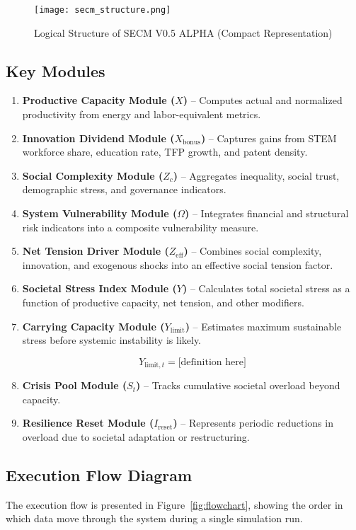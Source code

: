 \documentclass[12pt,a4paper]{article}
\begin{document}
\begin{figure}[H]
    \centering
    \texttt{[image: secm\_structure.png]}
    \caption{Logical Structure of SECM V0.5 ALPHA (Compact Representation)}
    \label{fig:structure}
\end{figure}

\subsection{Key Modules}
\begin{enumerate}
    \item \textbf{Productive Capacity Module (\(X\))} – Computes actual and normalized productivity from energy and labor-equivalent metrics.
    \item \textbf{Innovation Dividend Module (\(X_{\text{bonus}}\))} – Captures gains from STEM workforce share, education rate, TFP growth, and patent density.
    \item \textbf{Social Complexity Module (\(Z_c\))} – Aggregates inequality, social trust, demographic stress, and governance indicators.
    \item \textbf{System Vulnerability Module (\(\Omega\))} – Integrates financial and structural risk indicators into a composite vulnerability measure.
    \item \textbf{Net Tension Driver Module (\(Z_{\mathrm{eff}}\))} – Combines social complexity, innovation, and exogenous shocks into an effective social tension factor.
    \item \textbf{Societal Stress Index Module (\(Y\))} – Calculates total societal stress as a function of productive capacity, net tension, and other modifiers.
    \item \textbf{Carrying Capacity Module (\(Y_{\mathrm{limit}}\))} – Estimates maximum sustainable stress before systemic instability is likely.

\begin{equation}
Y_{\mathrm{limit},t} = \text{[definition here]}
\label{sec:Ylimit}
\end{equation}
    \item \textbf{Crisis Pool Module (\(S_t\))} – Tracks cumulative societal overload beyond capacity.
    \item \textbf{Resilience Reset Module (\(I_{\mathrm{reset}}\))} – Represents periodic reductions in overload due to societal adaptation or restructuring.
\end{enumerate}

\subsection{Execution Flow Diagram}
The execution flow is presented in Figure~\ref{fig:flowchart}, showing the order in which data move through the system during a single simulation run.
\end{document}
